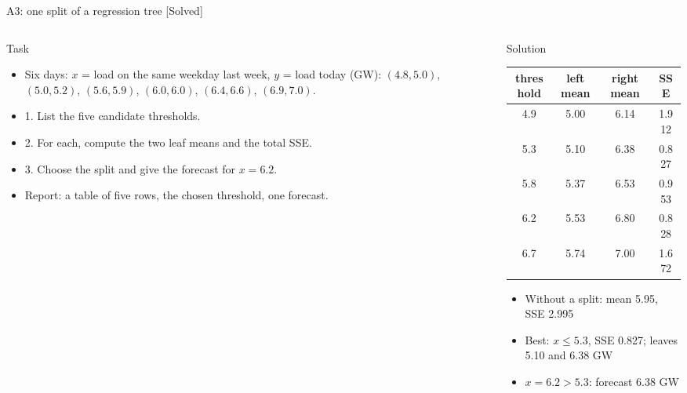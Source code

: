 \begin{frame}{A3: one split of a regression tree [Solved]}
\itemsize{\scriptsize}
\begin{columns}[T]
\begin{column}{0.47\textwidth}
\begin{block}{Task}
\begin{itemize}
    \item Six days: $x$ = load on the same weekday last week, $y$ = load today (GW): $(4.8, 5.0)$, $(5.0, 5.2)$, $(5.6, 5.9)$, $(6.0, 6.0)$, $(6.4, 6.6)$, $(6.9, 7.0)$.
    \item 1. List the five candidate thresholds.
    \item 2. For each, compute the two leaf means and the total SSE.
    \item 3. Choose the split and give the forecast for $x = 6.2$.
    \item Report: a table of five rows, the chosen threshold, one forecast.
\end{itemize}
\end{block}
\end{column}
\begin{column}{0.49\textwidth}
\begin{exampleblock}{Solution}
\begin{center}
\scriptsize
\begin{tabular}{cccc}
\toprule
threshold & left mean & right mean & SSE \\
\midrule
4.9 & 5.00 & 6.14 & 1.912 \\
5.3 & 5.10 & 6.38 & 0.827 \\
5.8 & 5.37 & 6.53 & 0.953 \\
6.2 & 5.53 & 6.80 & 0.828 \\
6.7 & 5.74 & 7.00 & 1.672 \\
\bottomrule
\end{tabular}
\end{center}
\begin{itemize}
    \item Without a split: mean 5.95, SSE 2.995
    \item Best: $x \le 5.3$, SSE 0.827; leaves 5.10 and 6.38 GW
    \item $x = 6.2 > 5.3$: forecast 6.38 GW
\end{itemize}
\end{exampleblock}
\end{column}
\end{columns}
\end{frame}

